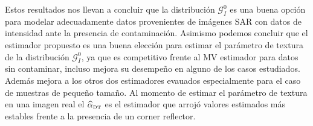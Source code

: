 
Estos resultados nos llevan a concluir que la distribución $\mathcal{G}_I^0$ es una buena opción para modelar adecuadamente datos provenientes de imágenes SAR con datos de intensidad ante la presencia de contaminación. Asimismo podemos concluir que el estimador propuesto es una buena elección para estimar el parámetro de textura de la distribución $\mathcal{G}_I^0$, ya que es competitivo frente al MV estimador para datos sin contaminar, incluso mejora su desempeño en alguno de los casos estudiados. Además mejora a los otros dos estimadores evauados especialmente para el caso de muestras de pequeño tamaño. Al momento de estimar el parámetro de textura en una imagen real el  $\widehat\alpha_{\text{\tiny{DT}}}$ es el estimador que arrojó valores estimados más estables frente a la presencia de un corner reflector.


